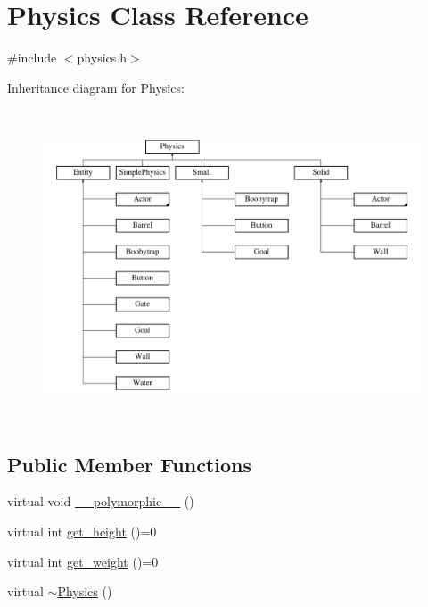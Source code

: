 \hypertarget{class_physics}{\section{Physics Class Reference}
\label{class_physics}
}


{\ttfamily \#include $<$physics.\-h$>$}

Inheritance diagram for Physics\-:\begin{figure}[H]
\begin{center}
\leavevmode
\includegraphics[height=9.240924cm]{class_physics}
\end{center}
\end{figure}
\subsection*{Public Member Functions}
\begin{DoxyCompactItemize}
\item 
virtual void \hyperlink{class_physics_ade73fc725515aeddef262f5b17b1b48c}{\-\_\-\-\_\-polymorphic\-\_\-\-\_\-} ()
\item 
virtual int \hyperlink{class_physics_ae3e59e7723c9f0334b88baf60c01f376}{get\-\_\-height} ()=0
\item 
virtual int \hyperlink{class_physics_a00580cf655d0569cc44f11b630cfcee7}{get\-\_\-weight} ()=0
\item 
virtual \hyperlink{class_physics_afdd87b5bb9fe2e927c37d50fbeb8216b}{$\sim$\-Physics} ()
\end{DoxyCompactItemize}


